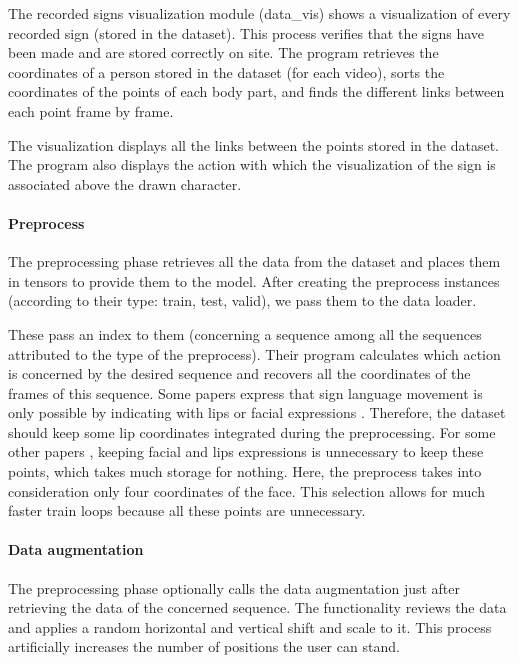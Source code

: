 The recorded signs visualization module (data\_vis) shows a visualization of every recorded sign (stored in the dataset). This process verifies that the signs have been made and are stored correctly on site.
The program retrieves the coordinates of a person stored in the dataset (for each video), sorts the coordinates of the points of each body part, and finds the different links between each point frame by frame. 

The visualization displays all the links between the points stored in the dataset. The program also displays the action with which the visualization of the sign is associated above the drawn character.

\paragraph{Preprocess}

The preprocessing phase retrieves all the data from the dataset and places them in tensors to provide them to the model.
After creating the preprocess instances (according to their type: train, test, valid), we pass them to the data loader. 

These pass an index to them (concerning a sequence among all the sequences attributed to the type of the preprocess). Their program calculates which action is concerned by the desired sequence and recovers all the coordinates of the frames of this sequence. 
Some papers express that sign language movement is only possible by indicating with lips or facial expressions \cite{cooper2011sign}. Therefore, the dataset should keep some lip coordinates integrated during the preprocessing. For some other papers \cite{dreuw2007speech}, keeping facial and lips expressions is unnecessary to keep these points, which takes much storage for nothing. Here, the preprocess takes into consideration only four coordinates of the face. This selection allows for much faster train loops because all these points are unnecessary.

\paragraph{Data augmentation}

The preprocessing phase optionally calls the data augmentation just after retrieving the data of the concerned sequence. The functionality reviews the data and applies a random horizontal and vertical shift and scale to it. This process artificially increases the number of positions the user can stand.


